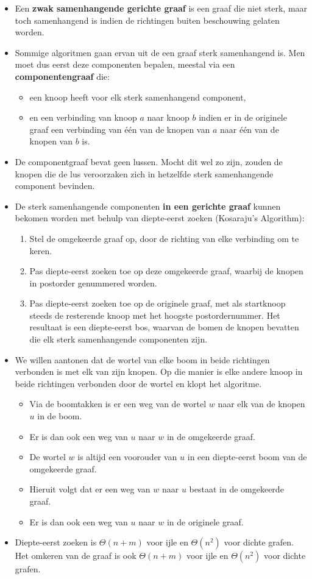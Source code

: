 \begin{itemize}
	\item Een \textbf{zwak samenhangende gerichte graaf} is een graaf die niet sterk, maar toch samenhangend is indien de richtingen buiten beschouwing gelaten worden. 
	\item Sommige algoritmen gaan ervan uit de een graaf sterk samenhangend is. Men moet dus eerst deze componenten bepalen, meestal via een \textbf{componentengraaf} die:
	\begin{itemize}
		\item een knoop heeft voor elk sterk samenhangend component,
		\item en een verbinding van knoop $a$ naar knoop $b$ indien er in de originele graaf een verbinding van één van de knopen van $a$ naar één van de knopen van $b$ is. 
	\end{itemize}
	\item De componentgraaf bevat geen lussen. Mocht dit wel zo zijn, zouden de knopen die de lus veroorzaken zich in hetzelfde sterk samenhangende component bevinden.
	\item De sterk samenhangende componenten \textbf{in een gerichte graaf} kunnen bekomen worden met behulp van diepte-eerst zoeken (Kosaraju's Algorithm):
	\begin{enumerate}
		\item Stel de omgekeerde graaf op, door de richting van elke verbinding om te keren.
		\item Pas diepte-eerst zoeken toe op deze omgekeerde graaf, waarbij de knopen in postorder genummered worden.
		\item Pas diepte-eerst zoeken toe op de originele graaf, met als startknoop steeds de resterende knoop met het hoogste postordernummer. Het resultaat is een diepte-eerst bos, waarvan de bomen de knopen bevatten die elk sterk samenhangende componenten zijn.
	\end{enumerate}
	\item We willen aantonen dat de wortel van elke boom in beide richtingen verbonden is met elk van zijn knopen.  Op die manier is elke andere knoop in beide richtingen verbonden door de wortel en klopt het algoritme.
	\begin{itemize}
		\item Via de boomtakken is er een weg van de wortel $w$ naar elk van de knopen $u$ in de boom. 
		\item Er is dan ook een weg van $u$ naar $w$ in de omgekeerde graaf.
		\item De wortel $w$ is altijd een voorouder van $u$ in een diepte-eerst boom van de omgekeerde graaf.
		\item Hieruit volgt dat er een weg van $w$ naar $u$ bestaat in de omgekeerde graaf.
		\item Er is dan ook een weg van $u$ naar $w$ in de originele graaf.
	\end{itemize}

	\item Diepte-eerst zoeken is $\Theta(n + m)$ voor ijle en $\Theta(n^2)$ voor dichte grafen. Het omkeren van de graaf is ook $\Theta(n + m)$ voor ijle en $\Theta(n^2)$ voor dichte grafen.
\end{itemize}




